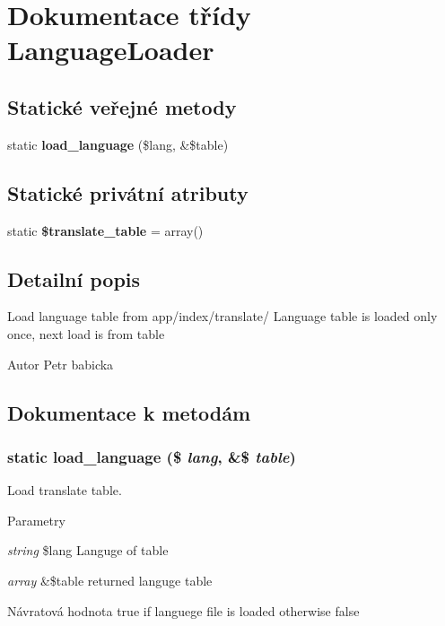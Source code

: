 \section{Dokumentace třídy LanguageLoader}
\label{d6/db2/class_language_loader}
\subsection*{Statické veřejné metody}
\begin{DoxyCompactItemize}
\item 
static {\bf load\_\-language} (\$lang, \&\$table)
\end{DoxyCompactItemize}
\subsection*{Statické privátní atributy}
\begin{DoxyCompactItemize}
\item 
static {\bf \$translate\_\-table} = array()
\end{DoxyCompactItemize}


\subsection{Detailní popis}
Load language table from app/index/translate/ Language table is loaded only once, next load is from table

\begin{DoxyAuthor}{Autor}
Petr babicka 
\end{DoxyAuthor}


\subsection{Dokumentace k metodám}
\subsubsection[{load\_\-language}]{\setlength{\rightskip}{0pt plus 5cm}static load\_\-language (\$ {\em lang}, \/  \&\$ {\em table})\hspace{0.3cm}{\ttfamily  [static]}}\label{d6/db2/class_language_loader_a702b28a903df7fe2ae6811bbe2061ccb}
Load translate table. 
\begin{DoxyParams}{Parametry}
\item[{\em string}]\$lang Languge of table \item[{\em array}]\&\$table returned languge table \end{DoxyParams}
\begin{DoxyReturn}{Návratová hodnota}
true if languege file is loaded otherwise false 
\end{DoxyReturn}


